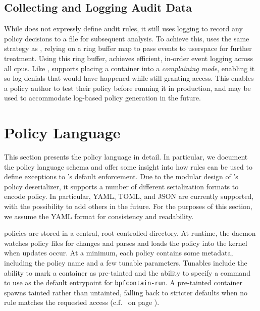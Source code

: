 \subsection{Collecting and Logging Audit Data}%
\label{ss:bpfcontain-audit}

While \bpfcontain{} does not expressly define audit rules, it still uses logging to record
any policy decisions to a file for subsequent analysis. To achieve this, \bpfcontain{}
uses the same strategy as \bpfbox{}, relying on a ring buffer map to pass events to
userspace for further treatment. Using this ring buffer, \bpfcontain{} achieves efficient,
in-order event logging across all \glspl{cpu}. Like \bpfbox{}, \bpfcontain{} supports
placing a container into a \textit{complaining mode}, enabling it so log denials that
would have happened while still granting access. This enables a policy author to test
their policy before running it in production, and may be used to accommodate log-based
policy generation in the future.



\section{\bpfcontain{} Policy Language}%
\label{s:bpfcontain-policy}

This section presents the \bpfcontain{} policy language in detail. In particular, we
document the policy language schema and offer some insight into how rules can be used to
define exceptions to \bpfcontain{}'s default enforcement. Due to the modular design of
\bpfcontain{}'s policy deserializer, it supports a number of different serialization
formats to encode policy. In particular, YAML, TOML, and JSON are currently supported,
with the possibility to add others in the future. For the purposes of this section, we
assume the YAML format for consistency and readability.

\bpfcontain{} policies are stored in a central, root-controlled directory. At runtime, the
daemon watches policy files for changes and parses and loads the policy into the kernel
when updates occur. At a minimum, each \bpfcontain{} policy contains some metadata,
including the policy name and a few tunable parameters. Tunables include the ability to
mark a container as pre-tainted and the ability to specify a command to use as the default
entrypoint for \texttt{bpfcontain-run}. A pre-tainted container spawns tainted rather than
untainted, falling back to stricter defaults when no rule matches the requested access
(c.f.~ on page \pageref{fig:bpfcontain-enforcement}).

